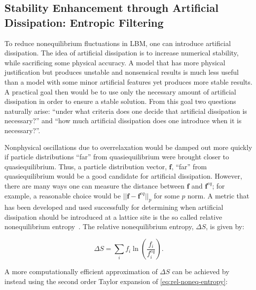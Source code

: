 \subsection{Stability Enhancement through Artificial Dissipation: Entropic Filtering}

To reduce nonequilibrium fluctuations in LBM, one can introduce artificial dissipation.
The idea of artificial dissipation is to increase numerical stability, while sacrificing some physical accuracy.
A model that has more physical justification but produces unstable and nonsensical results is much less useful than a model with some minor artificial features yet produces more stable results.
A practical goal then would be to use only the necessary amount of artificial dissipation in order to ensure a stable solution.
From this goal two questions naturally arise: ``under what criteria does one decide that artificial dissipation is necessary?'' and ``how much artificial dissipation does one introduce when it is necessary?''.

Nonphysical oscillations due to overrelaxation would be damped out more quickly if particle distributions ``far'' from quasiequilibrium were brought closer to quasiequilibrium.
Thus, a particle distribution vector, $\mathbf{f}$, ``far'' from quasiequilibrium would be a good candidate for artificial dissipation.
However, there are many ways one can measure the distance between $\mathbf{f}$ and $\mathbf{f}^{eq}$; for example, a reasonable choice would be $||\mathbf{f} - \mathbf{f}^{eq}||_p$ for some $p$ norm.
A metric that has been developed and used successfully for determining when artificial dissipation should be introduced at a lattice site is the so called relative nonequilibrium entropy~\cite{gorban2014enhancement,brownlee2006stabilization,brownlee2007stability,brownlee2008nonequilibrium,packwood2009entropy}.
The relative nonequilibrium entropy, $\Delta S$, is given by:

\begin{equation} \label{eq:rel-noneq-entropy}
\Delta S = \sum_i f_i \ln(\frac{f_i}{f^{eq}_i}).
\end{equation}

\noindent A more computationally efficient approximation of $\Delta S$ can be achieved by instead using the second order Taylor expansion of \eqref{eq:rel-noneq-entropy}:

